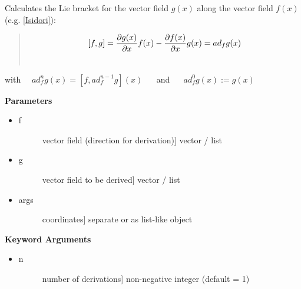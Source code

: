 \documentclass[letterpaper,10pt,english]{sphinxmanual}
\begin{document}
\begin{fulllineitems}
\label{pycontroltools:lietools.lietools.lie_bracket}
Calculates the Lie bracket for the vector field $g(x)$
along the vector field $f(x)$ (e.g. {\hyperref[pycontroltools_sources:isidori]{{[}Isidori{]}}}):
\begin{quote}
\begin{gather}
\begin{split}[f,g] = \frac{ \partial{g(x)} }{ \partial{x} }f(x)
        - \frac{ \partial{f(x)} }{ \partial{x} }g(x)
      = ad_fg(x)\end{split}\notag\\\begin{split}\end{split}\notag
\end{gather}\end{quote}

with $\quad$$ad_f^ng(x) = [f, ad_f^{n-1}g](x)$ $\quad$
and $\quad$ $ad_f^0g(x) := g(x)$

\textbf{Parameters}
\begin{itemize}
\item {} \begin{description}
\item[{f}] \leavevmode{[}vector field (direction for derivation){]}
vector / list

\end{description}

\item {} \begin{description}
\item[{g}] \leavevmode{[}vector field to be derived{]}
vector / list

\end{description}

\item {} \begin{description}
\item[{args}] \leavevmode{[}coordinates{]}
separate or as list-like object

\end{description}

\end{itemize}

\textbf{Keyword Arguments}
\begin{itemize}
\item {} \begin{description}
\item[{n}] \leavevmode{[}number of derivations{]}
non-negative integer (default = 1)


\end{description}
\end{itemize}
\end{fulllineitems}
\end{document}
